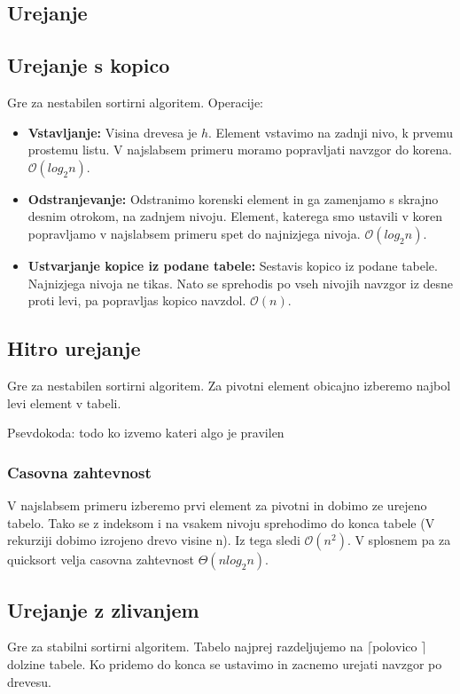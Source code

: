\documentclass{article}
\begin{document}
\begin{multicols}{2}
\section{Urejanje}
\subsection{Urejanje s kopico}
Gre za nestabilen sortirni algoritem.
Operacije:
\begin{itemize}
    \item \textbf{Vstavljanje:} Visina drevesa je $h$. Element vstavimo na zadnji nivo, k prvemu prostemu listu. V najslabsem primeru moramo popravljati navzgor do korena. $\mathcal{O}(log_2 n)$.
    \item \textbf{Odstranjevanje: } Odstranimo korenski element in ga zamenjamo s skrajno desnim otrokom, na zadnjem nivoju. Element, katerega smo ustavili v koren popravljamo v najslabsem primeru spet do najnizjega nivoja. $\mathcal{O}(log_2 n)$.
    \item \textbf{Ustvarjanje kopice iz podane tabele:} Sestavis kopico iz podane tabele. Najnizjega nivoja ne tikas. Nato se sprehodis po vseh nivojih navzgor iz desne proti levi, pa popravljas kopico navzdol. $\mathcal{O}(n)$.
\end{itemize}
\subsection{Hitro urejanje}
Gre za nestabilen sortirni algoritem. Za pivotni element obicajno izberemo najbol levi element v tabeli.

Psevdokoda:
todo ko izvemo kateri algo je pravilen

\subsubsection{Casovna zahtevnost}
V najslabsem primeru izberemo prvi element za pivotni in dobimo ze urejeno tabelo. Tako se z indeksom i na vsakem nivoju sprehodimo do konca tabele (V rekurziji dobimo izrojeno drevo visine n). Iz tega sledi $\mathcal{O}(n^2)$. V splosnem pa za quicksort velja casovna zahtevnost $\Theta (nlog_2 n)$.

\subsection{Urejanje z zlivanjem}
Gre za stabilni sortirni algoritem.
Tabelo najprej razdeljujemo na $\lceil \text{polovico }\rceil$ dolzine tabele.
Ko pridemo do konca se ustavimo in zacnemo urejati navzgor po drevesu.


\end{multicols}
\end{document}
